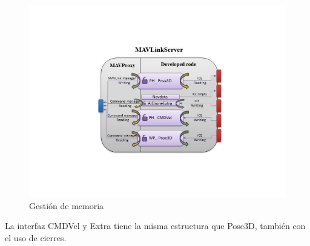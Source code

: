 \begin{figure}[H]
  \centering
  \includegraphics[scale=0.6]{imagenes/MavProxyPorDentro.png}
  \caption{Gestión de memoria}
  \label{fig:MavProxyInside}
\end{figure}

La interfaz CMDVel y Extra tiene la misma estructura que Pose3D, también con el uso de cierres.

